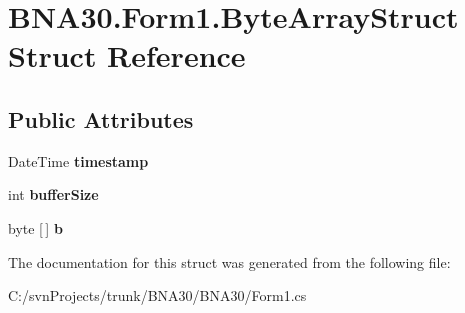 \hypertarget{struct_b_n_a30_1_1_form1_1_1_byte_array_struct}{}\section{B\+N\+A30.\+Form1.\+Byte\+Array\+Struct Struct Reference}
\label{struct_b_n_a30_1_1_form1_1_1_byte_array_struct}
\subsection*{Public Attributes}
\begin{DoxyCompactItemize}
\item 
\mbox{\label{struct_b_n_a30_1_1_form1_1_1_byte_array_struct_a439ec2e16b3c63f52d8b7ff36c303d0d}} 
Date\+Time {\bfseries timestamp}
\item 
\mbox{\label{struct_b_n_a30_1_1_form1_1_1_byte_array_struct_aff3a78bb0d27cc709ff515f2f1eed6cd}} 
int {\bfseries buffer\+Size}
\item 
\mbox{\label{struct_b_n_a30_1_1_form1_1_1_byte_array_struct_a4ccf136e22eb582779d825aaa8997137}} 
byte \mbox{[}$\,$\mbox{]} {\bfseries b}
\end{DoxyCompactItemize}


The documentation for this struct was generated from the following file\+:\begin{DoxyCompactItemize}
\item 
C\+:/svn\+Projects/trunk/\+B\+N\+A30/\+B\+N\+A30/Form1.\+cs\end{DoxyCompactItemize}
